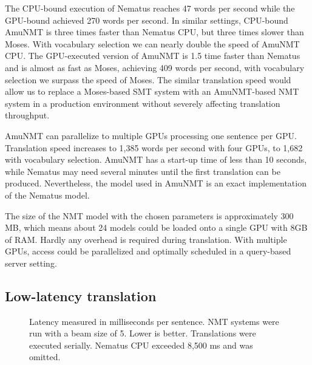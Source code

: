 \documentclass[11pt]{article}
\begin{document}
The CPU-bound execution of Nematus reaches 47 words per second while the GPU-bound achieved 270 words per second. In similar settings, CPU-bound AmuNMT is three times faster than Nematus CPU, but three times slower than Moses. With vocabulary selection we can nearly double the speed of AmuNMT CPU. The GPU-executed version of AmuNMT is 1.5 time faster than Nematus and is almost as fast as Moses, achieving 409 words per second, with vocabulary selection we surpass the speed of Moses. The similar translation speed would allow us to replace a Moses-based SMT system with an AmuNMT-based NMT system in a production environment without severely affecting translation throughput. 

AmuNMT can parallelize to multiple GPUs processing one sentence per GPU. Translation speed increases to 1,385 words per second with four GPUs, to 1,682 with vocabulary selection. 
AmuNMT has a start-up time of less than 10 seconds, while Nematus may need several minutes until the first translation can be produced. Nevertheless, the model used in AmuNMT is an exact implementation of the Nematus model.

The size of the NMT model with the chosen parameters is approximately 300 MB, which means about 24 models could be loaded onto a single GPU with 8GB of RAM. Hardly any overhead is required during translation. With multiple GPUs, access could be parallelized and optimally scheduled in a query-based server setting. 

\subsection{Low-latency translation}

\begin{figure}[t]
\centering
{}
\caption{Latency measured in milliseconds per sentence. NMT systems were run with a beam size of 5. Lower is better. Translations were executed serially. Nematus CPU exceeded 8,500 ms and was omitted.}\label{latency}
\end{figure}
\end{document}
